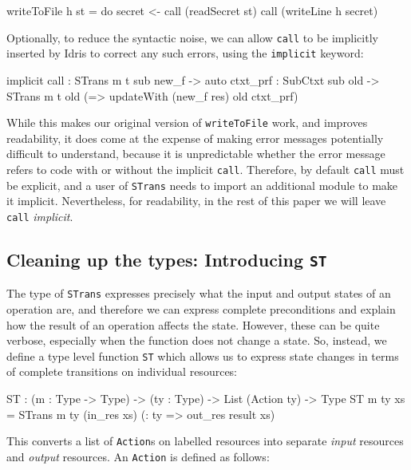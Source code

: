 \small
\begin{code}
writeToFile h st = do secret <- call (readSecret st)
                      call (writeLine h secret)
\end{code}
\normalsize

Optionally, to reduce the syntactic noise, we can allow \texttt{call}
to be implicitly inserted by Idris to correct any such errors, using
the \texttt{implicit} keyword:

\small
\begin{code}
implicit call : STrans m t sub new_f -> {auto ctxt_prf : SubCtxt sub old} ->
                STrans m t old (\res => updateWith (new_f res) old ctxt_prf)
\end{code}
\normalsize

While this makes our original version of \texttt{writeToFile} work, and
improves readability, it does come at the expense of making error messages
potentially difficult to understand, because it is unpredictable whether the
error message refers to code with or without the implicit \texttt{call}.
Therefore, by default \texttt{call} must be explicit, and
a user of \texttt{STrans} needs to import an additional module to
make it implicit. Nevertheless, for readability, in the rest of this paper we
will leave \texttt{call} \emph{implicit}.

\subsection{Cleaning up the types: Introducing \texttt{ST}}

\label{sect:sttype}

The type of \texttt{STrans} expresses precisely what the input and output
states of an operation are, and therefore we can express complete preconditions
and explain how the result of an operation affects the state. However, these
can be quite verbose, especially when the function does not change a state.
So, instead, we define a type level function
\texttt{ST} which allows us to express state changes in terms of 
complete transitions on individual resources:

\small
\begin{code}
ST : (m : Type -> Type) -> (ty : Type) -> List (Action ty) -> Type
ST m ty xs = STrans m ty (in_res xs) (\result : ty => out_res result xs)
\end{code}
\normalsize

This converts a list of \texttt{Action}s on labelled resources
into separate \emph{input} resources and \emph{output} resources. An
\texttt{Action} is defined as follows:


